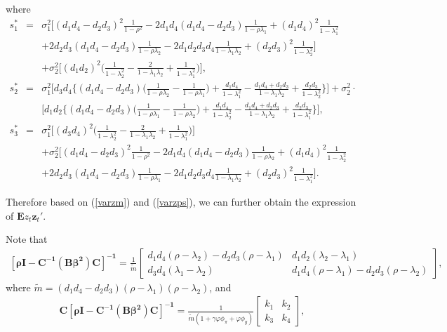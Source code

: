 \begin{appendix}
where
\begin{eqnarray}
s_1^*&=&\sigma_1^2\Big[(d_1d_4-d_2d_3)^2\frac{1}{1-\rho^2}-2d_1d_4(d_1d_4-d_2d_3)\frac{1}{1-\rho\lambda_1}+(d_1d_4)^2\frac{1}{1-\lambda_1^2}\nonumber\\
                          &&+2d_2d_3(d_1d_4-d_2d_3)\frac{1}{1-\rho\lambda_2}-2d_1d_2d_3d_4\frac{1}{1-\lambda_1\lambda_2}+(d_2d_3)^2\frac{1}{1-\lambda_2^2}\Big]\nonumber\\
                          &&+\sigma_2^2\Big[(d_1d_2)^2
\big(\frac{1}{1-\lambda_2^2}-\frac{2}{1-\lambda_1\lambda_2}+\frac{1}{1-\lambda_1^2}\big)\Big], \label{s1star}\\
s_2^*&=&\sigma_1^2\Big[d_3d_4\Big\{(d_1d_4-d_2d_3)\Big(\frac{1}{1-\rho\lambda_2}-\frac{1}{1-\rho\lambda_1}\Big)+\frac{d_1d_4}{1-\lambda_1^2}-\frac{d_1d_4+d_2d_3}{1-\lambda_1\lambda_2}+\frac{d_2d_3}{1-\lambda_2^2}\Big\}\Big]+\sigma_2^2\cdot\nonumber\\
&&\Big[d_1d_2\Big\{(d_1d_4-d_2d_3)\Big(\frac{1}{1-\rho\lambda_1}-\frac{1}{1-\rho\lambda_2}\Big)+\frac{d_1d_4}{1-\lambda_2^2}-\frac{d_1d_4+d_2d_3}{1-\lambda_1\lambda_2}+\frac{d_2d_3}{1-\lambda_1^2}\Big\}\Big],\label{s2star}\\
s_3^*&=&\sigma_1^2\Big[(d_3d_4)^2\big(\frac{1}{1-\lambda_2^2}-\frac{2}{1-\lambda_1\lambda_2}+\frac{1}{1-\lambda_1^2}\big)\Big]\nonumber\\
&&+\sigma_2^2\Big[(d_1d_4-d_2d_3)^2\frac{1}{1-\rho^2}-2d_1d_4(d_1d_4-d_2d_3)\frac{1}{1-\rho\lambda_2}+(d_1d_4)^2\frac{1}{1-\lambda_2^2}\nonumber\\
                          &&+2d_2d_3(d_1d_4-d_2d_3)\frac{1}{1-\rho\lambda_1}-2d_1d_2d_3d_4\frac{1}{1-\lambda_1\lambda_2}+(d_2d_3)^2\frac{1}{1-\lambda_1^2}\Big].\label{s3star}
\end{eqnarray}

Therefore based on (\ref{varzm}) and (\ref{varzps}), we can further obtain the expression of ${\pmb
Ez}_{t}{\pmb z}_{t}'$.    

Note that
\begin{eqnarray*}
\pmb{[\rho
I-C^{-1}(B\beta^2)C]^{-1}}=\frac{1}{\widetilde{m}}\left[\begin{array}{cc}
d_1d_4(\rho-\lambda_2)-d_2d_3(\rho-\lambda_1)&d_1d_2(\lambda_2-\lambda_1)\\
d_3d_4(\lambda_1-\lambda_2)&d_1d_4(\rho-\lambda_1)-d_2d_3(\rho-\lambda_2)
\end{array}\right],
\end{eqnarray*}
where
$\widetilde{m}=(d_1d_4-d_2d_3)(\rho-\lambda_1)(\rho-\lambda_2)$,
and
\begin{eqnarray*}
\pmb{C[\rho I-C^{-1}(B\beta^2)C]^{-1}}
=\frac{1}{\widetilde{m}(1+\gamma\varphi\phi_\pi+\varphi\phi_y)}\left[\begin{array}{cc}
k_1&k_2\\
k_3&k_4
\end{array}\right],
\end{eqnarray*}


\end{appendix}
